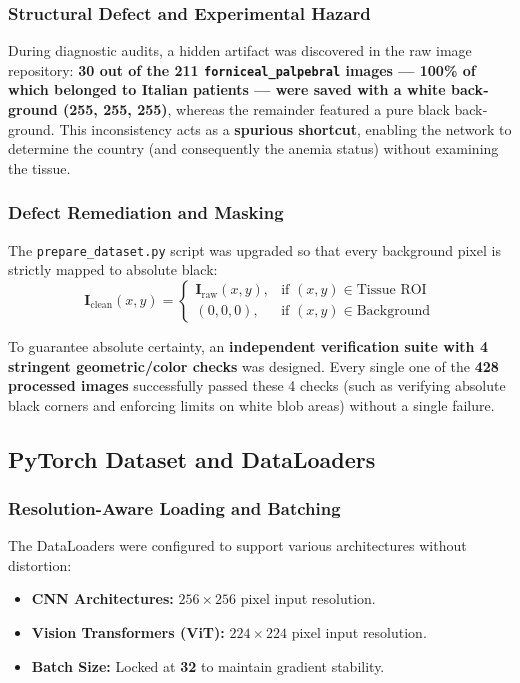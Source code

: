 \documentclass{article}
\begin{document}
\begin{latin}
		\subsubsection{Structural Defect and Experimental Hazard}
		During diagnostic audits, a hidden artifact was discovered in the raw image repository: \textbf{30 out of the 211 \texttt{forniceal\_palpebral} images — 100\% of which belonged to Italian patients — were saved with a white background (255, 255, 255)}, whereas the remainder featured a pure black background. This inconsistency acts as a \textbf{spurious shortcut}, enabling the network to determine the country (and consequently the anemia status) without examining the tissue.
		
		\subsubsection{Defect Remediation and Masking}
		The \texttt{prepare\_dataset.py} script was upgraded so that every background pixel is strictly mapped to absolute black:
		\begin{equation}
			\mathbf{I}_{\text{clean}}(x, y) = \begin{cases} 
				\mathbf{I}_{\text{raw}}(x, y), & \text{if } (x, y) \in \text{Tissue ROI} \\ 
				(0, 0, 0), & \text{if } (x, y) \in \text{Background} 
			\end{cases}
		\end{equation}
		
		To guarantee absolute certainty, an \textbf{independent verification suite with 4 stringent geometric/color checks} was designed. Every single one of the \textbf{428 processed images} successfully passed these 4 checks (such as verifying absolute black corners and enforcing limits on white blob areas) without a single failure.
		
		\subsection{PyTorch Dataset and DataLoaders}
		
		\subsubsection{Resolution-Aware Loading and Batching}
		The DataLoaders were configured to support various architectures without distortion:
		\begin{itemize}
			\item \textbf{CNN Architectures:} $256 \times 256$ pixel input resolution.
			\item \textbf{Vision Transformers (ViT):} $224 \times 224$ pixel input resolution.
			\item \textbf{Batch Size:} Locked at \textbf{32} to maintain gradient stability.
		\end{itemize}
		

\end{latin}
\end{document}
